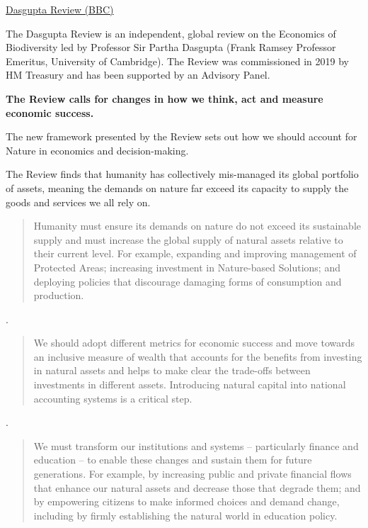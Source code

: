 \documentclass[
]{book}
\begin{document}
\href{https://www.bbc.com/news/science-environment-55893696}{Dasgupta Review (BBC)}

The Dasgupta Review is an independent, global review on the Economics of Biodiversity led by Professor Sir Partha Dasgupta (Frank Ramsey Professor Emeritus, University of Cambridge). The Review was commissioned in 2019 by HM Treasury and has been supported by an Advisory Panel.

\textbf{The Review calls for changes in how we think, act and measure economic success.}

The new framework presented by the Review sets out
how we should account for Nature in economics and decision-making.

The Review finds that humanity has collectively mis-managed its global portfolio of assets,
meaning the demands on nature far exceed its capacity to supply the goods and services
we all rely on.

\begin{quote}
Humanity must ensure its demands on nature do not exceed its sustainable supply and must increase the global supply of natural assets relative to their current level. For example, expanding and improving management of Protected Areas; increasing investment in Nature-based Solutions; and deploying policies that discourage damaging forms of consumption and production.
\end{quote}

.

\begin{quote}
We should adopt different metrics for economic success and move towards an inclusive measure of wealth that accounts for the benefits from investing in natural assets and helps to make clear the trade-offs between investments in different assets. Introducing natural capital into national accounting systems is a critical step.
\end{quote}

.

\begin{quote}
We must transform our institutions and systems -- particularly finance and education -- to enable these changes and sustain them for future generations. For example, by increasing public and private financial flows that enhance our natural assets and decrease those that degrade them; and by empowering citizens to make informed choices and demand change, including by firmly establishing the natural world in education policy.
\end{quote}
\end{document}
